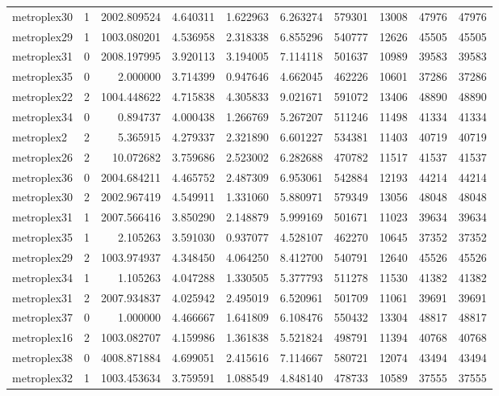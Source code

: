 \documentclass[../../../thesis.tex]{subfiles}
\begin{document}
\begin{longtable}{|l|r|r|r|r|r|r|r|r|r|}
metroplex30 & 1 & 2002.809524 & 4.640311 & 1.622963 & 6.263274 & 579301 & 13008 & 47976 & 47976 \\
metroplex29 & 1 & 1003.080201 & 4.536958 & 2.318338 & 6.855296 & 540777 & 12626 & 45505 & 45505 \\
metroplex31 & 0 & 2008.197995 & 3.920113 & 3.194005 & 7.114118 & 501637 & 10989 & 39583 & 39583 \\
metroplex35 & 0 & 2.000000 & 3.714399 & 0.947646 & 4.662045 & 462226 & 10601 & 37286 & 37286 \\
metroplex22 & 2 & 1004.448622 & 4.715838 & 4.305833 & 9.021671 & 591072 & 13406 & 48890 & 48890 \\
metroplex34 & 0 & 0.894737 & 4.000438 & 1.266769 & 5.267207 & 511246 & 11498 & 41334 & 41334 \\
metroplex2 & 2 & 5.365915 & 4.279337 & 2.321890 & 6.601227 & 534381 & 11403 & 40719 & 40719 \\
metroplex26 & 2 & 10.072682 & 3.759686 & 2.523002 & 6.282688 & 470782 & 11517 & 41537 & 41537 \\
metroplex36 & 0 & 2004.684211 & 4.465752 & 2.487309 & 6.953061 & 542884 & 12193 & 44214 & 44214 \\
metroplex30 & 2 & 2002.967419 & 4.549911 & 1.331060 & 5.880971 & 579349 & 13056 & 48048 & 48048 \\
metroplex31 & 1 & 2007.566416 & 3.850290 & 2.148879 & 5.999169 & 501671 & 11023 & 39634 & 39634 \\
metroplex35 & 1 & 2.105263 & 3.591030 & 0.937077 & 4.528107 & 462270 & 10645 & 37352 & 37352 \\
metroplex29 & 2 & 1003.974937 & 4.348450 & 4.064250 & 8.412700 & 540791 & 12640 & 45526 & 45526 \\
metroplex34 & 1 & 1.105263 & 4.047288 & 1.330505 & 5.377793 & 511278 & 11530 & 41382 & 41382 \\
metroplex31 & 2 & 2007.934837 & 4.025942 & 2.495019 & 6.520961 & 501709 & 11061 & 39691 & 39691 \\
metroplex37 & 0 & 1.000000 & 4.466667 & 1.641809 & 6.108476 & 550432 & 13304 & 48817 & 48817 \\
metroplex16 & 2 & 1003.082707 & 4.159986 & 1.361838 & 5.521824 & 498791 & 11394 & 40768 & 40768 \\
metroplex38 & 0 & 4008.871884 & 4.699051 & 2.415616 & 7.114667 & 580721 & 12074 & 43494 & 43494 \\
metroplex32 & 1 & 1003.453634 & 3.759591 & 1.088549 & 4.848140 & 478733 & 10589 & 37555 & 37555 \\

\end{longtable}
\end{document}
